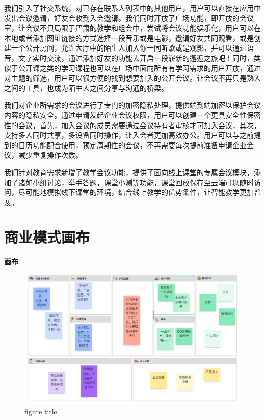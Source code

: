 \documentclass[a4paper,12pt]{article}
\begin{document}
我们引入了社交系统，对已存在联系人列表中的其他用户，用户可以直接在应用中发出会议邀请，好友会收到入会邀请。我们同时开放了广场功能，即开放的会议室，让会议不只局限于严肃的教学和组会中，尝试将会议功能娱乐化，用户可以在本地或者添加网址链接的方式选择一段音乐或是电影，邀请好友共同观看，或是创建一个公开房间，允许大厅中的陌生人加入你一同听歌或是观影，并可以通过语音，文字实时交流，通过添加好友的功能去开启一段崭新的邂逅之旅吧！同时，类似于公开课之类的学习课程也可以在广场中面向所有有学习需求的用户开放，通过对主题的筛选，用户可以很方便的找到想要加入的公开会议。让会议不再只是熟人之间的工具，也成为陌生人之间分享与沟通的桥梁。

我们对企业所需求的会议进行了专门的加密隐私处理，提供端到端加密以保护会议内容的隐私安全。通过申请发起企业会议权限，用户可以创建一个更具安全性保密性的会议，首先，加入会议的成员需要通过会议持有者审核才可加入会议，其次，支持多人同时共享，多设备同时操作，让入会者更加高效办公。用户可以与之前提到的日历功能配合使用，预定周期性的会议，不再需要每次提前准备申请企业会议，减少重复操作次数。

我们针对教育需求新增了教学会议功能，提供了面向线上课堂的专属会议模块，添加了诸如小组讨论，举手答题，课堂小测等功能，课堂回放保存至云端可以随时访问，尽可能地模拟线下课堂的环境，结合线上教学的优势条件，让智能教学更加普及。

\tableofcontents
\section{商业模式画布}
\textbf{画布}
\begin{figure}[htbp]
    \centering
    \includegraphics[scale=0.5]{腾讯会议商业模式画布.png}
    \caption{figure title}
    \label{figure}
\end{figure}
\end{document}
